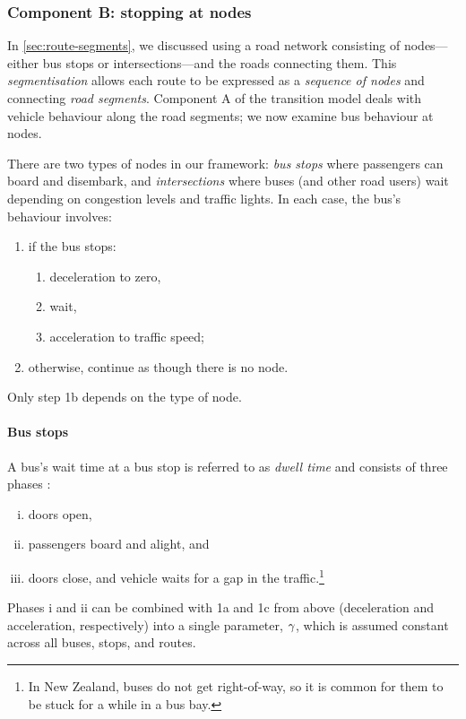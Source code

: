 \subsubsection{Component B: stopping at nodes}
\label{sec:vehicle_model_nodes}

In \cref{sec:route-segments}, we discussed using a road network consisting of nodes---either bus stops or intersections---and the roads connecting them. This \emph{segmentisation} allows each route to be expressed as a \emph{sequence of nodes} and connecting \emph{road segments}. Component A of the transition model deals with vehicle behaviour along the road segments; we now examine bus behaviour at nodes.

There are two types of nodes in our framework: \emph{bus stops} where passengers can board and disembark, and \emph{intersections} where buses (and other road users) wait depending on congestion levels and traffic lights. In each case, the bus's behaviour involves:
\begin{enumerate}
\item if the bus stops:
    \begin{enumerate}
    \item deceleration to zero,
    \item wait,
    \item acceleration to traffic speed;
    \end{enumerate}
\item otherwise, continue as though there is no node.
\end{enumerate}
Only step 1b depends on the type of node.



\paragraph{Bus stops}

A bus's wait time at a bus stop is referred to as \emph{dwell time} and consists of three phases \citep{Hans_2015,Robinson_2013,Meng_2013,Wang_2016}:
\begin{enumerate}[i.]
\item doors open,
\item passengers board and alight, and
\item doors close, and vehicle waits for a gap in the traffic.\footnote{In New Zealand, buses do not get right-of-way, so it is common for them to be stuck for a while in a bus bay.}
\end{enumerate}
Phases i and ii can be combined with 1a and 1c from above (deceleration and acceleration, respectively) into a single parameter, $\gamma$, which is assumed constant across all buses, stops, and routes.


